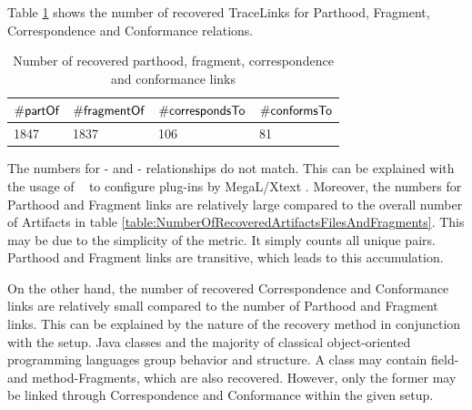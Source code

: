 Table \ref{table:NumberOfRecoveredParthoodFragmentCorrespondenceAndConformanceLinks} shows the number of recovered \glspl{TraceLink} for \gls{Parthood}, \gls{Fragment}, \gls{Correspondence} and \gls{Conformance} relations.
\begin{table}[h!]
\begin{center}
\begin{tabular}{|l|l|l|l|}
\hline
$\#\textsf{partOf}$ & $\#\textsf{fragmentOf}$ & $\#\textsf{correspondsTo}$ & $\#\textsf{conformsTo}$
\\ \hline
1847 & 1837 & 106 & 81 
\\ \hline
\end{tabular}
\end{center}
\caption{Number of recovered parthood, fragment, correspondence and conformance links}
\label{table:NumberOfRecoveredParthoodFragmentCorrespondenceAndConformanceLinks}
\end{table}
The numbers for \partOf- and \fragmentOf- relationships do not match.
This can be explained with the usage of \partOf~ to configure plug-ins by \gls{MegaL/Xtext} \cite{LukasHaertelBScThesis}.
Moreover, the numbers for \gls{Parthood} and \gls{Fragment} links are relatively large compared to the overall number of \glspl{Artifact} in table \ref{table:NumberOfRecoveredArtifactsFilesAndFragments}.
This may be due to the simplicity of the metric.
It simply counts all unique pairs.
\Gls{Parthood} and \gls{Fragment} links are transitive, which leads to this accumulation.

On the other hand, the number of recovered \gls{Correspondence} and \gls{Conformance} links are relatively small compared to the number of \Gls{Parthood} and \gls{Fragment} links.
This can be explained by the nature of the recovery method in conjunction with the setup.
\gls{Java} classes and the majority of classical object-oriented programming languages group behavior and structure.
A class may contain field- and method-\glspl{Fragment}, which are also recovered.
However, only the former may be linked through \gls{Correspondence} and \gls{Conformance} within the given setup.

